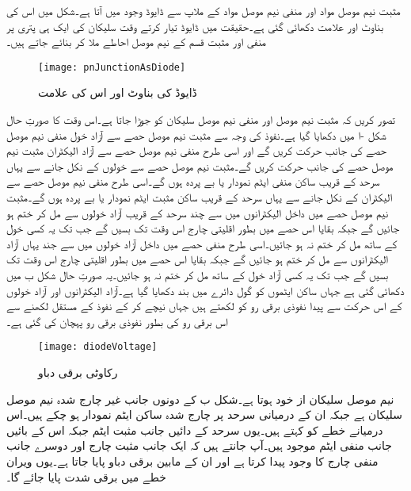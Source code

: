 	مثبت نیم موصل مواد اور منفی نیم موصل مواد کے ملاپ سے ڈایوڈ   وجود میں آتا ہے۔شکل   میں اس کی بناوٹ اور علامت دکھائی گئی ہے۔حقیقت میں ڈایوڈ تیار کرتے وقت سلیکان کی ایک ہی پتری پر منفی اور مثبت  قسم کے نیم موصل احاطے ملا کر بنائے جاتے ہیں۔
\begin{figure}
\centering
\texttt{[image: pnJunctionAsDiode]}
\caption{ڈایوڈ کی بناوٹ اور اس کی علامت}
\label{شکل_ڈایوڈ_کی_بناوٹ}
\end{figure}
	تصور کریں کہ مثبت نیم موصل اور منفی نیم موصل سلیکان کو جوڑا جاتا ہے۔اس وقت کا صورتِ حال شکل -ا میں دکھایا گیا ہے۔نفوذ کی وجہ سے مثبت نیم موصل حصے سے آزاد خول منفی نیم موصل حصے کی جانب حرکت کریں گے اور اسی طرح منفی نیم موصل حصے سے آزاد الیکٹران مثبت نیم موصل حصے کی جانب حرکت کریں گے۔مثبت نیم موصل حصے سے خولوں کے نکل جانے سے یہاں سرحد کے قریب ساکن منفی ایٹم نمودار یا بے پردہ  ہوں گے۔اسی طرح منفی نیم موصل حصے سے الیکٹران کے نکل جانے سے یہاں سرحد کے قریب ساکن مثبت ایٹم نمودار یا بے پردہ ہوں گے۔مثبت نیم موصل حصے میں داخل الیکٹرانوں میں سے چند سرحد کے قریب آزاد خولوں سے مل کر ختم ہو جائیں گے جبکہ بقایا اس حصے میں بطور اقلیتی چارج اس وقت تک بسیں گے جب تک یہ کسی خول کے ساتھ مل کر ختم نہ ہو جائیں۔اسی طرح منفی حصے میں داخل آزاد خولوں میں سے جند یہاں آزاد الیکٹرانوں سے مل کر ختم ہو جائیں گے جبکہ بقایا اس حصے میں بطور اقلیتی چارج اس وقت تک بسیں گے جب تک یہ کسی آزاد خول کے ساتھ مل کر ختم نہ ہو جائیں۔یہ صورتِ حال شکل  ب میں دکھائی گئی ہے جہاں ساکن ایٹموں کو گول دائرے میں بند دکھایا گیا ہے۔آزاد الیکٹرانوں اور آزاد خولوں کے اس حرکت سے پیدا نفوذی برقی رو کو  لکھتے ہیں جہاں نیچے کر کے نفوذ کے مستقل  لکھنے سے اس برقی رو کی بطور نفوذی برقی رو پہچان کی گئی ہے۔
\begin{figure}
\centering
\texttt{[image: diodeVoltage]}
\caption{رکاوٹی برقی دباو}
\label{شکل_رکاوٹی_برقی_دباو}
\end{figure}
نیم موصل سلیکان از خود  ہوتا ہے۔شکل  ب کے دونوں جانب غیر چارج شدہ  نیم موصل سلیکان ہے جبکہ ان کے درمیانی سرحد پر چارج شدہ ساکن ایٹم نمودار ہو چکے ہیں۔اس درمیانے خطے کو  کہتے ہیں۔یوں سرحد کے دائیں جانب مثبت ایٹم جبکہ اس کے بائیں جانب منفی ایٹم موجود ہیں۔آپ جانتے ہیں کہ ایک جانب مثبت چارج اور دوسرے جانب منفی چارج کا وجود    پیدا کرتا ہے اور ان  کے مابین برقی دباو   پایا جاتا ہے۔یوں ویران خطے میں برقی شدت  پایا جائے گا۔


